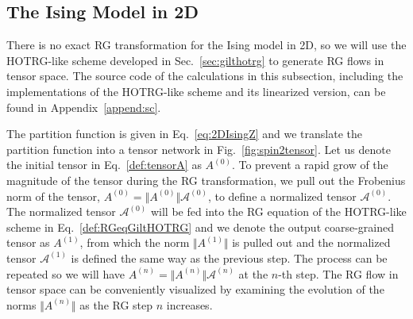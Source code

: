 \documentclass[aps,prr,reprint,superscriptaddress,nofootinbib,floatfix]{revtex4-2}
\begin{document}
\subsection{The Ising Model in 2D\label{benchmark:2DIsing}}
There is no exact RG transformation for the Ising model in 2D, so we will use the HOTRG-like scheme developed in Sec.~\ref{sec:gilthotrg} to generate RG flows in tensor space. 
The source code of the calculations in this subsection, including the implementations of the HOTRG-like scheme and its linearized version, can be found in Appendix~\ref{append:sc}.
%

The partition function is given in Eq.~\eqref{eq:2DIsingZ} and we translate the partition function into a tensor network in Fig.~\ref{fig:spin2tensor}. 
Let us denote the initial tensor in Eq.~\eqref{def:tensorA} as $A^{(0)}$. 
To prevent a rapid grow of the magnitude of the tensor during the RG transformation, we pull out the Frobenius norm of the tensor, $A^{(0)} = \Vert A^{(0)}\Vert \mathcal{A}^{(0)}$, to define a normalized tensor $\mathcal{A}^{(0)}$. 
The normalized tensor $\mathcal{A}^{(0)}$ will be fed into the RG equation of the HOTRG-like scheme in Eq.~\eqref{def:RGeqGiltHOTRG} and we denote the output coarse-grained tensor as $A^{(1)}$, from which the norm $\Vert A^{(1)}\Vert$ is pulled out and the normalized tensor $\mathcal{A}^{(1)}$ is defined the same way as the previous step. 
The process can be repeated so we will have $A^{(n)} = \Vert A^{(n)}\Vert \mathcal{A}^{(n)}$ at the $n$-th step. 
The RG flow in tensor space can be conveniently visualized by examining the evolution of the norms $\Vert A^{(n)}\Vert$ as the RG step $n$ increases.
%
\end{document}
